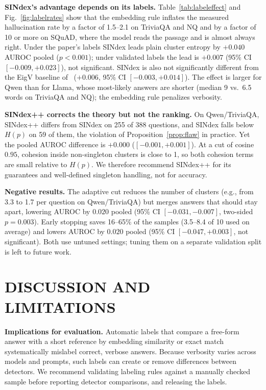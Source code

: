 \documentclass{ieeetj}
\begin{document}
\textbf{SINdex's advantage depends on its labels.} Table~\ref{tab:labeleffect} and Fig.~\ref{fig:labelrates} show that the embedding rule inflates the measured hallucination rate by a factor of 1.5--2.1 on TriviaQA and NQ and by a factor of 10 or more on SQuAD, where the model reads the passage and is almost always right. Under the paper's labels SINdex leads plain cluster entropy by $+0.040$ AUROC pooled ($p<0.001$); under validated labels the lead is $+0.007$ (95\% CI $[-0.009,+0.023]$), not significant. SINdex is also not significantly different from the EigV baseline of~\cite{lin2024generating} ($+0.006$, 95\% CI $[-0.003,+0.014]$). The effect is larger for Qwen than for Llama, whose most-likely answers are shorter (median 9 vs.\ 6.5 words on TriviaQA and NQ); the embedding rule penalizes verbosity.

\textbf{SINdex++ corrects the theory but not the ranking.} On Qwen/TriviaQA, SINdex++ differs from SINdex on 255 of 388 questions, and SINdex falls below $H(p)$ on 59 of them, the violation of Proposition~\ref{prop:flaw} in practice. Yet the pooled AUROC difference is $+0.000$ ($[-0.001,+0.001]$). At a cut of cosine $0.95$, cohesion inside non-singleton clusters is close to 1, so both cohesion terms are small relative to $H(p)$. We therefore recommend SINdex++ for its guarantees and well-defined singleton handling, not for accuracy.

\textbf{Negative results.} The adaptive cut reduces the number of clusters (e.g., from 3.3 to 1.7 per question on Qwen/TriviaQA) but merges answers that should stay apart, lowering AUROC by $0.020$ pooled (95\% CI $[-0.031,-0.007]$, two-sided $p=0.003$). Early stopping saves 16--65\% of the samples (3.5--8.4 of 10 used on average) and lowers AUROC by $0.020$ pooled (95\% CI $[-0.047,+0.003]$, not significant). Both use untuned settings; tuning them on a separate validation split is left to future work.

\section{DISCUSSION AND LIMITATIONS}
\textbf{Implications for evaluation.} Automatic labels that compare a free-form answer with a short reference by embedding similarity or exact match systematically mislabel correct, verbose answers. Because verbosity varies across models and prompts, such labels can create or remove differences between detectors. We recommend validating labeling rules against a manually checked sample before reporting detector comparisons, and releasing the labels.
\end{document}

